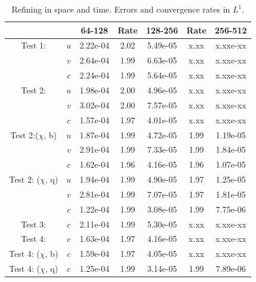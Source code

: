 \documentclass[final]{siamltex}
\begin{document}
\begin{table}[h]
\begin{center}
\caption{Refining in space and time.  Errors and convergence rates in $L^1$.}
\begin{tabular}{ccccccc}
& & 64-128 & Rate & 128-256 & Rate & 256-512 \\
\hline
Test 1:             & $u$ & 2.22e-04 & 2.02 & 5.49e-05 & x.xx & x.xxe-xx \\
                    & $v$ & 2.64e-04 & 1.99 & 6.63e-05 & x.xx & x.xxe-xx \\
                    & $c$ & 2.24e-04 & 1.99 & 5.64e-05 & x.xx & x.xxe-xx \\
\hline
Test 2:             & $u$ & 1.98e-04 & 2.00 & 4.96e-05 & x.xx & x.xxe-xx \\
                    & $v$ & 3.02e-04 & 2.00 & 7.57e-05 & x.xx & x.xxe-xx \\
                    & $c$ & 1.57e-04 & 1.97 & 4.01e-05 & x.xx & x.xxe-xx \\
\hline
Test 2:($\chi$, b)  & $u$ & 1.87e-04 & 1.99 & 4.72e-05 & 1.99 & 1.19e-05 \\
                    & $v$ & 2.91e-04 & 1.99 & 7.33e-05 & 1.99 & 1.84e-05 \\
                    & $c$ & 1.62e-04 & 1.96 & 4.16e-05 & 1.96 & 1.07e-05 \\
\hline
Test 2: ($\chi$, q) & $u$ & 1.94e-04 & 1.99 & 4.90e-05 & 1.97 & 1.25e-05 \\
                    & $v$ & 2.81e-04 & 1.99 & 7.07e-05 & 1.97 & 1.81e-05 \\
                    & $c$ & 1.22e-04 & 1.99 & 3.08e-05 & 1.99 & 7.75e-06 \\
\hline
Test 3:             & $c$ & 2.11e-04 & 1.99 & 5.30e-05 & x.xx & x.xxe-xx \\
\hline
Test 4:             & $c$ & 1.63e-04 & 1.97 & 4.16e-05 & x.xx & x.xxe-xx \\
\hline
Test 4: ($\chi$, b) & $c$ & 1.59e-04 & 1.97 & 4.05e-05 & x.xx & x.xxe-xx \\
\hline
Test 4: ($\chi$, q) & $c$ & 1.25e-04 & 1.99 & 3.14e-05 & 1.99 & 7.89e-06
\end{tabular}
\end{center}
\end{table}
\end{document}
